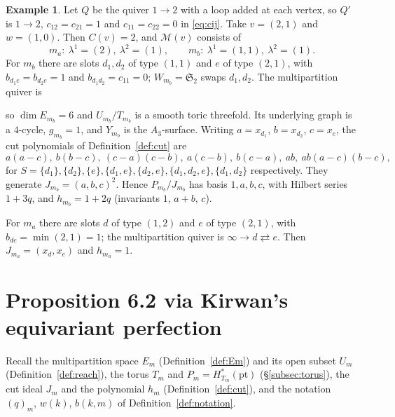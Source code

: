 \documentclass[11pt]{amsart}
\theoremstyle{definition}
\newtheorem{example}[theorem]{Example}
\theoremstyle{remark}
\numberwithin{equation}{section}
\newcommand{\cM}{\mathcal{M}}
\begin{document}
\begin{example}\label{ex:A2}
Let $Q$ be the quiver $1\to2$ with a loop added at each vertex, so $Q'$ is $1\to 2$, $c_{12}=c_{21}=1$
and $c_{11}=c_{22}=0$ in \eqref{eq:cij}. Take $v=(2,1)$ and $w=(1,0)$. Then $C(v)=2$, and $\cM(v)$
consists of
\[
  m_a:\ \lambda^1=(2),\ \lambda^2=(1),\qquad m_b:\ \lambda^1=(1,1),\ \lambda^2=(1).
\]
For $m_b$ there are slots $d_1,d_2$ of type $(1,1)$ and $e$ of type $(2,1)$, with $b_{d_1e}=b_{d_2e}=1$
and $b_{d_1d_2}=c_{11}=0$; $W_{m_b}=\mathfrak S_2$ swaps $d_1,d_2$. The multipartition quiver is
\begin{center}
\end{center}
so $\dim E_{m_b}=6$ and $U_{m_b}/T_{m_b}$ is a smooth toric threefold. Its underlying graph is a
$4$-cycle, $g_{m_b}=1$, and $Y_{m_b}$ is the $A_3$-surface. Writing $a=x_{d_1}$, $b=x_{d_2}$, $c=x_e$,
the cut polynomials of Definition~\ref{def:cut} are
\[
  a(a-c),\ b(b-c),\ (c-a)(c-b),\ a(c-b),\ b(c-a),\ ab,\ ab(a-c)(b-c),
\]
for $S=\{d_1\},\{d_2\},\{e\},\{d_1,e\},\{d_2,e\},\{d_1,d_2,e\},\{d_1,d_2\}$ respectively. They generate
$J_{m_b}=(a,b,c)^2$. Hence $P_{m_b}/J_{m_b}$ has basis $1,a,b,c$, with Hilbert series $1+3q$, and
$h_{m_b}=1+2q$ (invariants $1$, $a+b$, $c$).

For $m_a$ there are slots $d$ of type $(1,2)$ and $e$ of type $(2,1)$, with $b_{de}=\min(2,1)=1$; the
multipartition quiver is $\infty\to d\rightleftarrows e$. Then $J_{m_a}=(x_d,x_e)$ and $h_{m_a}=1$.
\end{example}

\section{Proposition 6.2 via Kirwan's equivariant perfection}\label{sec:kirwan}

Recall the multipartition space $E_m$ (Definition~\ref{def:Em}) and its open subset $U_m$
(Definition~\ref{def:reach}), the torus $T_m$ and $P_m=H^*_{T_m}(\mathrm{pt})$ (\S\ref{subsec:torus}), the
cut ideal $J_m$ and the polynomial $h_m$ (Definition~\ref{def:cut}), and the notation $(q)_m$, $w(k)$,
$b(k,m)$ of Definition~\ref{def:notation}.
\end{document}

